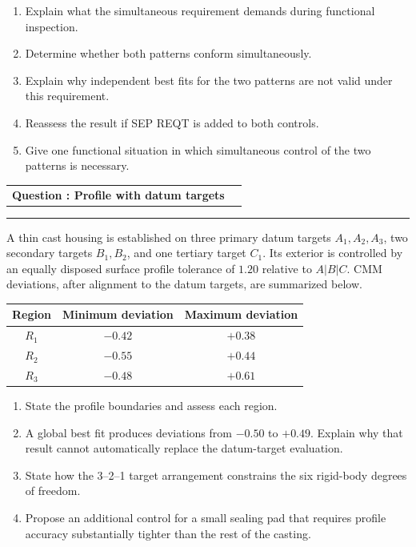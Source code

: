 \documentclass[11pt,a4paper]{article}
\makeatletter
\newcommand{\leveltag}[1]{%
  \fcolorbox{navy}{softgray}{\strut\small\bfseries\color{navy}#1}%
}
\newcommand{\qhead}[2]{%
  \clearpage
  \noindent\begin{tabularx}{\linewidth}{@{}Xr@{}}
  {\Large\bfseries\color{navy}Question \thequestion: #1} & \leveltag{#2}
  \end{tabularx}\par\vspace{-1mm}
  \noindent\rule{\linewidth}{0.6pt}\par\vspace{1mm}
}
\newcounter{question}
\newcommand{\question}[2]{\stepcounter{question}\qhead{#1}{#2}}
\makeatother
\begin{document}
\begin{enumerate}[label=(\alph*)]
\item Explain what the simultaneous requirement demands during functional inspection.
\item Determine whether both patterns conform simultaneously.
\item Explain why independent best fits for the two patterns are not valid under this requirement.
\item Reassess the result if \textsc{SEP REQT} is added to both controls.
\item Give one functional situation in which simultaneous control of the two patterns is necessary.
\end{enumerate}

\question{Profile with datum targets}{Level II}

A thin cast housing is established on three primary datum targets $A_1,A_2,A_3$, two secondary targets $B_1,B_2$, and one tertiary target $C_1$. Its exterior is controlled by an equally disposed surface profile tolerance of $1.20$ relative to $A|B|C$. CMM deviations, after alignment to the datum targets, are summarized below.

\begin{center}
\begin{tabular}{c c c}
\toprule
Region & Minimum deviation & Maximum deviation\\
\midrule
$R_1$ & $-0.42$ & $+0.38$\\
$R_2$ & $-0.55$ & $+0.44$\\
$R_3$ & $-0.48$ & $+0.61$\\
\bottomrule
\end{tabular}
\end{center}

\begin{enumerate}[label=(\alph*)]
\item State the profile boundaries and assess each region.
\item A global best fit produces deviations from $-0.50$ to $+0.49$. Explain why that result cannot automatically replace the datum-target evaluation.
\item State how the 3--2--1 target arrangement constrains the six rigid-body degrees of freedom.
\item Propose an additional control for a small sealing pad that requires profile accuracy substantially tighter than the rest of the casting.
\end{enumerate}
\end{document}

